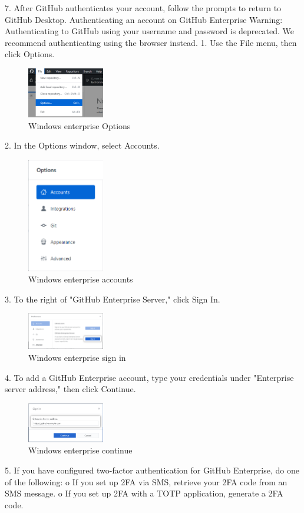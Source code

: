 7.	After GitHub authenticates your account, follow the prompts to return to GitHub Desktop.
Authenticating an account on GitHub Enterprise
Warning: Authenticating to GitHub using your username and password is deprecated. We recommend authenticating using the browser instead.
1.	Use the File menu, then click Options.
\begin{figure}[ht]
    \centering
    \includegraphics[width=0.3\textwidth]{figures/WIN EN Options.png}
    \caption{Windows enterprise Options}
\end{figure}
2.	In the Options window, select Accounts.
\begin{figure}[ht]
    \centering
    \includegraphics[width=0.3\textwidth]{figures/WIN EN Accounts.png}
    \caption{Windows enterprise accounts}
\end{figure}
3.	To the right of "GitHub Enterprise Server," click Sign In.
\begin{figure}[ht]
    \centering
    \includegraphics[width=0.3\textwidth]{figures/WIN EN Sign In.png}
    \caption{Windows enterprise sign in }
\end{figure}

4.	To add a GitHub Enterprise account, type your credentials under "Enterprise server address," then click Continue.
\begin{figure}[ht]
    \centering
    \includegraphics[width=0.3\textwidth]{figures/WIN EN Continue.png}
    \caption{Windows enterprise continue}
\end{figure}
5.	If you have configured two-factor authentication for GitHub Enterprise, do one of the following:
o	If you set up 2FA via SMS, retrieve your 2FA code from an SMS message.
o	If you set up 2FA with a TOTP application, generate a 2FA code.

